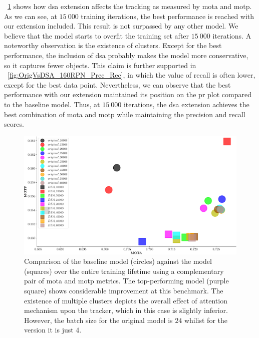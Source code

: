 \figtext{}~\ref{fig:OrigVsDSA_160RPN_MOTA_MOTP} shows how \gls{dsa} extension affects the tracking as measured by \gls{mota} and \gls{motp}. As we can see, at $15\ 000$ training iterations, the best performance is reached with our extension included. This result is not surpassed by any other model. We believe that the model starts to overfit the training set after $15\ 000$ iterations. A noteworthy observation is the existence of clusters. Except for the best performance, the inclusion of \gls{dsa} probably makes the model more conservative, so it captures fewer objects. This claim is further supported in \figtext{}~\ref{fig:OrigVsDSA_160RPN_Prec_Rec}, in which the value of recall is often lower, except for the best data point. Nevertheless, we can observe that the best performance with our extension maintained its position on the \gls{pr} plot compared to the baseline model. Thus, at $15\ 000$ iterations, the \gls{dsa} extension achieves the best combination of \gls{mota} and \gls{motp} while maintaining the precision and recall scores.

\begin{figure}[t]
    \centerline{\includegraphics[width=\linewidth]{figures/siamese_tracking/tracker_cmp_160_2x12_vs_160_2x2_DSA_MOTA_MOTP.pdf}}
    \caption[\gls{dsa} evaluation - primary metrics]{Comparison of the baseline model (circles) against the \dsamodel{} model (squares) over the entire training lifetime using a complementary pair of \gls{mota} and \gls{motp} metrics. The top-performing \dsamodel{} model (purple square) shows considerable improvement at this benchmark. The existence of multiple clusters depicts the overall effect of attention mechanism upon the tracker, which in this case is slightly inferior. However, the batch size for the original model is $24$ whilist for the \dsamodel{} version it is just $4$.}
    \label{fig:OrigVsDSA_160RPN_MOTA_MOTP}
\end{figure}

